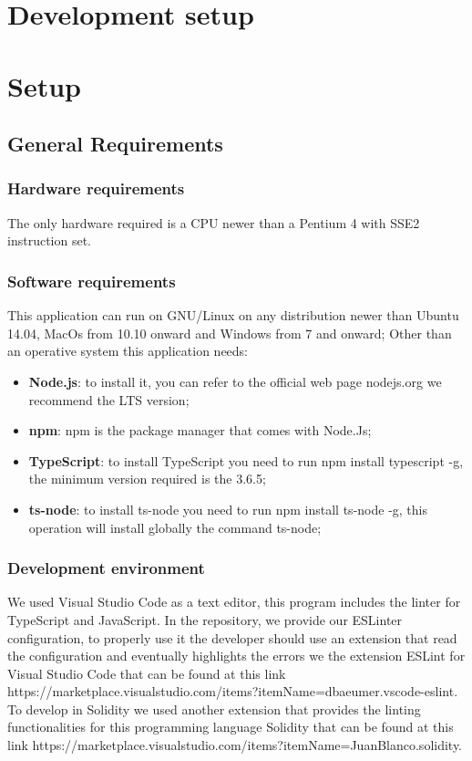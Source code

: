 \section{Development setup}
\section{Setup}
\subsection{General Requirements}
\subsubsection{Hardware requirements}
The only hardware required is a CPU newer than a Pentium 4 with SSE2 instruction set.
\subsubsection{Software requirements}
This application can run on GNU/Linux on any distribution newer than Ubuntu 14.04, MacOs from 10.10 onward and Windows from 7 and onward;
Other than an operative system this application needs:
\begin{itemize}
    \item \textbf{Node.js}: to install it, you can refer to the official web page nodejs.org we recommend the LTS version;
    \item \textbf{npm}: npm is the package manager that comes with Node.Js;
    \item \textbf{TypeScript}: to install TypeScript you need to run npm install typescript -g, the minimum version required is the 3.6.5;
    \item \textbf{ts-node}: to install ts-node you need to run npm install ts-node -g, this operation will install globally the command ts-node;
\end{itemize}
\subsubsection{Development environment}
We used Visual Studio Code as a text editor, this program includes the linter for TypeScript and JavaScript.
In the repository, we provide our ESLinter configuration,
to properly use it the developer should use an extension that read the configuration and eventually highlights the errors we the extension ESLint
for Visual Studio Code that can be found at this link https://marketplace.visualstudio.com/items?itemName=dbaeumer.vscode-eslint.
To develop in Solidity we used another extension that provides the linting functionalities for this programming language Solidity that can be found
at this link https://marketplace.visualstudio.com/items?itemName=JuanBlanco.solidity.


